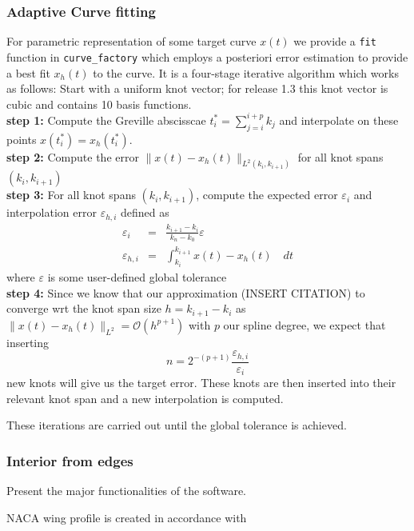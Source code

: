 \documentclass[preprint,12pt, a4paper]{elsarticle}
\begin{document}
\subsubsection{Adaptive Curve fitting}
\label{}
For parametric representation of some target curve $x(t)$ we provide a \texttt{fit} function in \texttt{curve\_factory} which employs a posteriori error estimation to provide a best fit $x_h(t)$ to the curve.
It is a four-stage iterative algorithm which works as follows:
Start with a uniform knot vector; for release 1.3 this knot vector is cubic and contains 10  basis functions.
\\ \textbf{step 1:}
Compute the Greville abscisscae $t^*_i = \sum_{j=i}^{i+p} k_j$ and interpolate on these points $x(t_i^*) = x_h(t_i^*)$.
\\ \textbf{step 2:}
Compute the error $\|x(t)-x_h(t)\|_{L^2(k_i,k_{i+1})}$ for all knot spans $(k_i,k_{i+1})$
\\ \textbf{step 3:}
For all knot spans $(k_i,k_{i+1})$, compute the expected error $\varepsilon_i$ and interpolation error $\varepsilon_{h,i}$ defined as
\begin{eqnarray}
    \varepsilon_i     & = & \frac{k_{i+1} - k_i}{k_n - k_0}\varepsilon \\
    \varepsilon_{h,i} & = & \int_{k_i}^{k_{i+1}} x(t) - x_h(t)\quad dt
\end{eqnarray}
where $\varepsilon$ is some user-defined global tolerance
\\ \textbf{step 4:}
Since we know that our approximation (INSERT CITATION) to converge wrt the knot span size $h=k_{i+1}-k_i$ as $\|x(t)-x_h(t)\|_{L^2} = \mathcal{O}(h^{p+1})$ with $p$ our spline degree, we expect that inserting
\begin{equation}
    n = 2^{-(p+1)}\frac{\varepsilon_{h,i}}{\varepsilon_i}
\end{equation}
new knots will give us the target error.
These knots are then inserted into their relevant knot span and a new interpolation is computed.

These iterations are carried out until the global tolerance is achieved.

\subsubsection{Interior from edges}
\label{}

Present the major functionalities of the software.

NACA wing profile is created in accordance with \cite{abbott1959tow}
\end{document}
